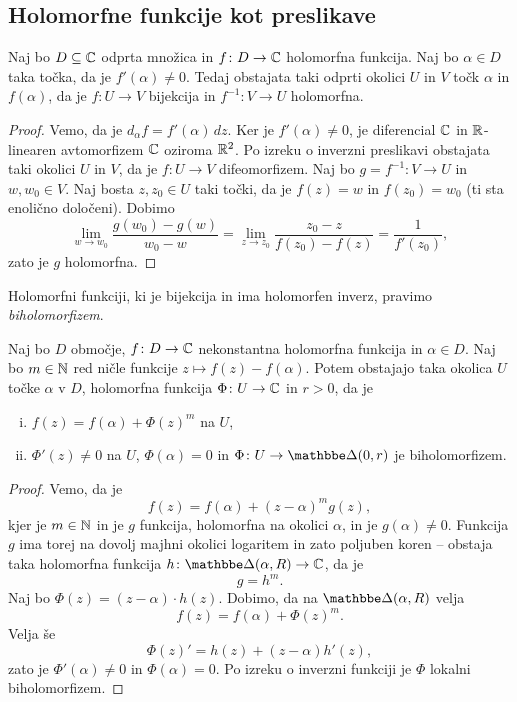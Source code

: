 \newpage

\subsection{Holomorfne funkcije kot preslikave}

\begin{izrek}
Naj bo $D \subseteq \mathbb{C}$ odprta množica in $f \colon D \to \mathbb{C}$
holomorfna funkcija. Naj bo $\alpha \in D$ taka točka, da je
$f'(\alpha) \ne 0$. Tedaj obstajata taki odprti okolici $U$ in $V$
točk $\alpha$ in $f(\alpha)$, da je $f \colon U \to V$ bijekcija in
$f^{-1} \colon V \to U$ holomorfna.
\end{izrek}

\begin{proof}
Vemo, da je $d_\alpha f = f'(\alpha)\,dz$. Ker je
$f'(\alpha) \ne 0$, je diferencial $\mathbb{C}$ in $\mathbb{R}$-linearen
avtomorfizem $\mathbb{C}$ oziroma $\mathbb{R}^2$. Po izreku o inverzni preslikavi
obstajata taki okolici $U$ in $V$, da je $f \colon U \to V$
difeomorfizem. Naj bo $g = f^{-1} \colon V \to U$ in
$w, w_0 \in V$. Naj bosta $z, z_0 \in U$ taki točki, da je
$f(z) = w$ in $f(z_0) = w_0$ (ti sta enolično določeni). Dobimo
\[
\lim_{w \to w_0} \frac{g(w_0) - g(w)}{w_0 - w} =
\lim_{z \to z_0} \frac{z_0 - z}{f(z_0) - f(z)} =
\frac{1}{f'(z_0)},
\]
zato je $g$ holomorfna.
\end{proof}

\begin{opomba}
Holomorfni funkciji, ki je bijekcija in ima holomorfen inverz,
pravimo \emph{biholomorfizem}.
\end{opomba}

\begin{posledica}
Naj bo $D$ območje, $f \colon D \to \mathbb{C}$ nekonstantna holomorfna
funkcija in $\alpha \in D$. Naj bo $m \in \mathbb{N}$ red ničle funkcije
$z \mapsto f(z) - f(\alpha)$. Potem obstajajo taka okolica $U$
točke $\alpha$ v $D$, holomorfna funkcija $\Phi \colon U \to \mathbb{C}$ in
$r > 0$, da je

\begin{enumerate}[i)]
\item $f(z) = f(\alpha) + \Phi(z)^m$ na $U$,
\item $\Phi'(z) \ne 0$ na $U$, $\Phi(\alpha) = 0$ in
$\Phi \colon U \to \dsk(0, r)$ je
biholomorfizem.
\end{enumerate}
\end{posledica}

\begin{proof}
Vemo, da je
\[
f(z) = f(\alpha) + (z - \alpha)^m g(z),
\]
kjer je $m \in \mathbb{N}$ in je $g$ funkcija, holomorfna na okolici
$\alpha$, in je $g(\alpha) \ne 0$. Funkcija $g$ ima torej na dovolj
majhni okolici logaritem in zato poljuben koren -- obstaja taka
holomorfna funkcija $h \colon \dsk(\alpha, R) \to \C$, da je
\[
g = h^m.
\]
Naj bo $\Phi(z) = (z - \alpha) \cdot h(z)$. Dobimo, da na
$\dsk(\alpha, R)$ velja
\[
f(z) = f(\alpha) + \Phi(z)^m.
\]
Velja še
\[
\Phi(z)' = h(z) + (z - \alpha) h'(z),
\]
zato je $\Phi'(\alpha) \ne 0$ in $\Phi(\alpha) = 0$. Po izreku o
inverzni funkciji je $\Phi$ lokalni biholomorfizem.
\end{proof}

